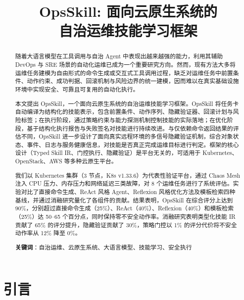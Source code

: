\documentclass[11pt,a4paper]{ctexart}
\title{\textbf{OpsSkill: 面向云原生系统的\\自治运维技能学习框架}}
\author{}
\date{}
\begin{document}
\maketitle
\thispagestyle{empty}

\begin{abstract}
随着大语言模型在工具调用与自治 Agent 中表现出越来越强的能力，利用其辅助 DevOps 与 SRE 场景的自动化运维已成为一个重要研究方向。然而，现有方法大多将运维任务建模为自由形式的命令生成或交互式工具调用过程，缺乏对运维任务中前置条件、动作约束、成功判据、回滚机制与风险边界的统一建模，因而难以在真实基础设施环境中实现安全、可靠且可复用的自动化执行。

本文提出 OpsSkill，一个面向云原生系统的自治运维技能学习框架。OpsSkill 将任务卡自动编译为结构化的技能表示，包含前置条件、动作序列、隐藏验证器、回滚计划与风险标签；在执行阶段，通过策略约束与能力探测机制控制技能的实际落地；在优化阶段，基于结构化执行报告与失败签名对技能进行持续改进。与仅依赖命令返回结果的评估不同，OpsSkill 进一步设计了面向真实远程环境的多信号隐藏验证机制，综合对象状态、事件、日志与服务健康信息，对技能是否真正完成运维目标进行判定。框架的核心设计（Typed Skill IR、门控执行、隐藏验证）是平台无关的，可适用于 Kubernetes、OpenStack、AWS 等多种云原生平台。

我们以 Kubernetes 集群（3 节点，K8s v1.33.6）为代表性验证平台，通过 Chaos Mesh 注入 CPU 压力、内存压力和网络延迟三类故障，对 8 个运维任务进行了系统评估。实验对比了直接命令生成、ReAct 风格 Agent、Reflexion 风格优化方法及模板检索四种基线，并通过消融研究量化了各组件的贡献。结果表明，OpsSkill 在综合评分上达到 90\%，分别超过直接命令生成（25\%）、ReAct（40\%）、Reflexion（40\%）和模板检索（25\%）达 50--65 个百分点，同时保持零不安全动作率。消融研究表明类型化技能 IR 贡献了 65\% 的评分提升，隐藏验证贡献了 30\%，策略门控以 1\% 的评分代价将不安全动作率从 12\% 降至 0\%。

\noindent\textbf{关键词}：自治运维、云原生系统、大语言模型、技能学习、安全执行
\end{abstract}

\newpage
\setcounter{page}{1}

\section{引言}
\end{document}
